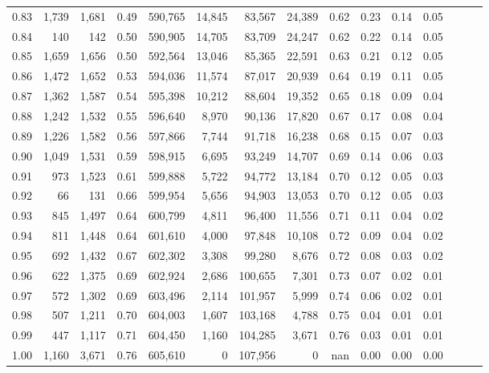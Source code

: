 \begin{tabular}{rrrrrrrrrrrrrrr}
0.83 &   1,739 &  1,681 &  0.49 &  590,765 &   14,845 &   83,567 &   24,389 &  0.62 &  0.23 &  0.14 &      0.05 \\
0.84 &     140 &    142 &  0.50 &  590,905 &   14,705 &   83,709 &   24,247 &  0.62 &  0.22 &  0.14 &      0.05 \\
0.85 &   1,659 &  1,656 &  0.50 &  592,564 &   13,046 &   85,365 &   22,591 &  0.63 &  0.21 &  0.12 &      0.05 \\
0.86 &   1,472 &  1,652 &  0.53 &  594,036 &   11,574 &   87,017 &   20,939 &  0.64 &  0.19 &  0.11 &      0.05 \\
0.87 &   1,362 &  1,587 &  0.54 &  595,398 &   10,212 &   88,604 &   19,352 &  0.65 &  0.18 &  0.09 &      0.04 \\
0.88 &   1,242 &  1,532 &  0.55 &  596,640 &    8,970 &   90,136 &   17,820 &  0.67 &  0.17 &  0.08 &      0.04 \\
0.89 &   1,226 &  1,582 &  0.56 &  597,866 &    7,744 &   91,718 &   16,238 &  0.68 &  0.15 &  0.07 &      0.03 \\
0.90 &   1,049 &  1,531 &  0.59 &  598,915 &    6,695 &   93,249 &   14,707 &  0.69 &  0.14 &  0.06 &      0.03 \\
0.91 &     973 &  1,523 &  0.61 &  599,888 &    5,722 &   94,772 &   13,184 &  0.70 &  0.12 &  0.05 &      0.03 \\
0.92 &      66 &    131 &  0.66 &  599,954 &    5,656 &   94,903 &   13,053 &  0.70 &  0.12 &  0.05 &      0.03 \\
0.93 &     845 &  1,497 &  0.64 &  600,799 &    4,811 &   96,400 &   11,556 &  0.71 &  0.11 &  0.04 &      0.02 \\
0.94 &     811 &  1,448 &  0.64 &  601,610 &    4,000 &   97,848 &   10,108 &  0.72 &  0.09 &  0.04 &      0.02 \\
0.95 &     692 &  1,432 &  0.67 &  602,302 &    3,308 &   99,280 &    8,676 &  0.72 &  0.08 &  0.03 &      0.02 \\
0.96 &     622 &  1,375 &  0.69 &  602,924 &    2,686 &  100,655 &    7,301 &  0.73 &  0.07 &  0.02 &      0.01 \\
0.97 &     572 &  1,302 &  0.69 &  603,496 &    2,114 &  101,957 &    5,999 &  0.74 &  0.06 &  0.02 &      0.01 \\
0.98 &     507 &  1,211 &  0.70 &  604,003 &    1,607 &  103,168 &    4,788 &  0.75 &  0.04 &  0.01 &      0.01 \\
0.99 &     447 &  1,117 &  0.71 &  604,450 &    1,160 &  104,285 &    3,671 &  0.76 &  0.03 &  0.01 &      0.01 \\
1.00 &   1,160 &  3,671 &  0.76 &  605,610 &        0 &  107,956 &        0 &   nan &  0.00 &  0.00 &      0.00 \\
\bottomrule
\end{tabular}
